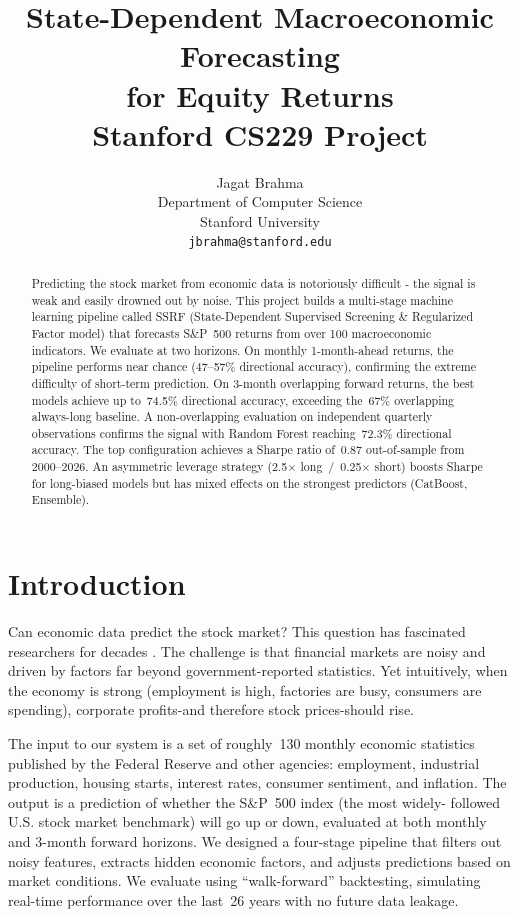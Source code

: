 \documentclass{article}
\title{
  State-Dependent Macroeconomic Forecasting \\
  for Equity Returns \\
  \vspace{1em}
  \small{\normalfont Stanford CS229 Project}
}
\author{
  Jagat Brahma \\
  Department of Computer Science \\
  Stanford University \\
  \texttt{jbrahma@stanford.edu}
}
\begin{document}
\maketitle

\begin{abstract}
Predicting the stock market from economic data is notoriously difficult -
the signal is weak and easily drowned out by noise. This project builds a
multi-stage machine learning pipeline called SSRF (State-Dependent Supervised
Screening \& Regularized Factor model) that forecasts S\&P~500 returns
from over 100 macroeconomic indicators. We evaluate at two horizons. On
monthly 1-month-ahead returns, the pipeline performs near chance (47--57\%
directional accuracy), confirming the extreme difficulty of short-term
prediction. On 3-month overlapping forward returns, the best models achieve
up to~74.5\% directional accuracy, exceeding the~67\% overlapping always-long
baseline. A non-overlapping evaluation on independent quarterly observations
confirms the signal with Random Forest reaching~72.3\% directional accuracy.
The top configuration achieves a Sharpe ratio of~0.87
out-of-sample from 2000--2026. An asymmetric leverage strategy
(2.5$\times$ long~/~0.25$\times$ short) boosts Sharpe for long-biased models
but has mixed effects on the strongest predictors (CatBoost, Ensemble).
\end{abstract}


\section{Introduction}

Can economic data predict the stock market? This question has fascinated
researchers for decades \citep{goyal2008comprehensive}. The challenge is
that financial markets are noisy and driven by factors far beyond
government-reported statistics. Yet intuitively, when the economy is strong
(employment is high, factories are busy, consumers are spending), corporate
profits-and therefore stock prices-should rise.

The input to our system is a set of roughly~130 monthly economic statistics
published by the Federal Reserve and other agencies: employment, industrial
production, housing starts, interest rates, consumer sentiment, and inflation.
The output is a prediction of whether the S\&P~500 index (the most widely-
followed U.S. stock market benchmark) will go up or down, evaluated at both
monthly and 3-month forward horizons. We designed a four-stage pipeline that
filters out noisy features, extracts hidden economic factors, and adjusts
predictions based on market conditions. We evaluate using ``walk-forward''
backtesting, simulating real-time performance over the last~26 years with
no future data leakage.
\end{document}
